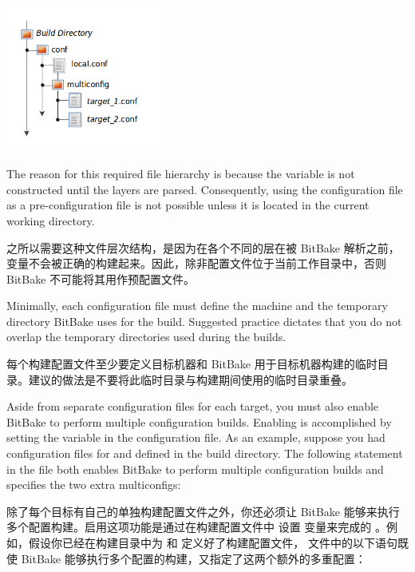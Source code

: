 \begin{center}
\includegraphics[width=0.4\textwidth]{contents/1_overview/bb_multiconfig_files.png}
\end{center}
The reason for this required file hierarchy is because the  variable is not constructed until the layers are parsed. Consequently, using the configuration file as a pre-configuration file is not possible unless it is located in the current working directory.

之所以需要这种文件层次结构，是因为在各个不同的层在被 BitBake 解析之前， 变量不会被正确的构建起来。因此，除非配置文件位于当前工作目录中，否则 BitBake 不可能将其用作预配置文件。

Minimally, each configuration file must define the machine and the temporary directory BitBake uses for the build. Suggested practice dictates that you do not overlap the temporary directories used during the builds.

每个构建配置文件至少要定义目标机器和 BitBake 用于目标机器构建的临时目录。建议的做法是不要将此临时目录与构建期间使用的临时目录重叠。

Aside from separate configuration files for each target, you must also enable BitBake to perform multiple configuration builds. Enabling is accomplished by setting the  variable in the  configuration file. As an example, suppose you had configuration files for  and  defined in the build directory. The following statement in the  file both enables BitBake to perform multiple configuration builds and specifies the two extra multiconfigs:

除了每个目标有自己的单独构建配置文件之外，你还必须让 BitBake 能够来执行多个配置构建。启用这项功能是通过在构建配置文件中  设置  变量来完成的 。例如，假设你已经在构建目录中为  和  定义好了构建配置文件，  文件中的以下语句既使 BitBake 能够执行多个配置的构建，又指定了这两个额外的多重配置：

